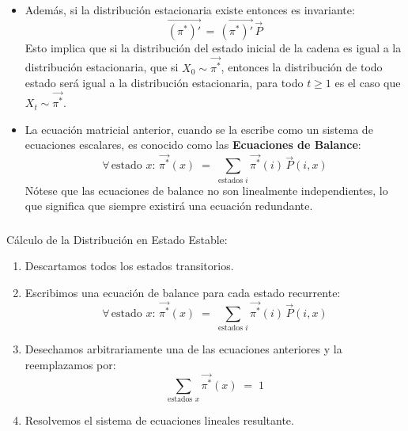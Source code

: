 \documentclass[ 10pt, xcolor = dvipsnames]{beamer}
\begin{document}
\begin{frame}[allowframebreaks]
\begin{itemize}
\item Adem\'as, si la distribuci\'on estacionaria existe entonces es invariante: 
\[
\vec{(\pi^*)'} \, = \, \vec{(\pi^*)'} \, \vec{P}
\]
Esto implica que si la distribuci\'on del estado inicial de la cadena es igual a \linebreak la distribuci\'on estacionaria, \ie que si $X_0 \sim \vec{\pi^*}$, entonces la distribuci\'on de todo estado ser\'a igual a la distribuci\'on estacionaria, \ie para todo $t \geq 1$ \linebreak es el caso que $X_t \sim \vec{\pi^*}$. 
\item La ecuaci\'on matricial anterior, cuando se la escribe como un sistema de ecuaciones escalares, es conocido como las \textbf{Ecuaciones de Balance}: 
\[
\forall \, \text{estado } x \colon \, \vec{\pi^*}(x) \; = \; 
\sum_{\text{estados }i} \vec{\pi^*}(i) \, \vec{P}(i,x) 
\]
N\'otese que las ecuaciones de balance no son linealmente independientes, \linebreak lo que significa que siempre existir\'a una ecuaci\'on redundante. 
\end{itemize}

\end{frame}

\begin{frame}[allowframebreaks]
\frametitle{\insertsubsection}

C\'alculo de la Distribuci\'on en Estado Estable: 
\begin{enumerate}
\item Descartamos todos los estados transitorios. 
\item Escribimos una ecuaci\'on de balance para cada estado recurrente: 
\[
\forall \, \text{estado } x \colon \, \vec{\pi^*}(x) \; = \; 
\sum_{\text{estados }i} \vec{\pi^*}(i) \, \vec{P}(i,x) 
\]
\item Desechamos arbitrariamente una de las ecuaciones anteriores y la reemplazamos por: 
\[
\sum_{\text{estados } x} \vec{\pi^*}(x) \; = \; 1
\]
\item Resolvemos el sistema de ecuaciones lineales resultante. 
\end{enumerate}

\end{frame}
\end{document}
